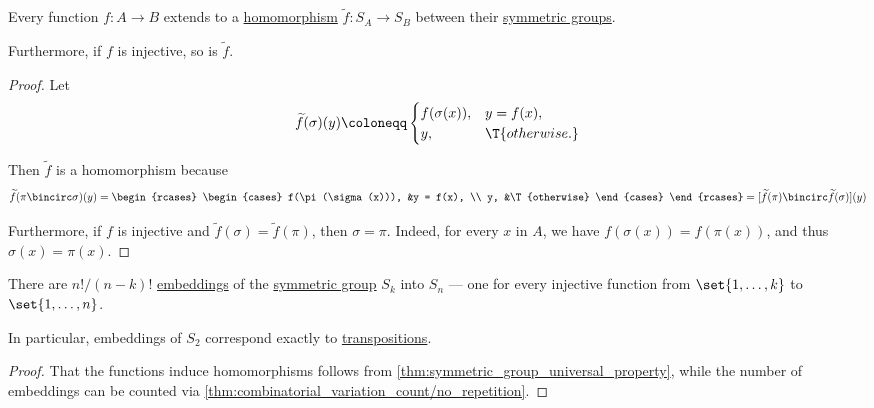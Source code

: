 \begin{proposition}\label{thm:symmetric_group_universal_property}
  Every function \( f: A \to B \) extends to a \hyperref[def:group/morphism]{homomorphism} \( \widetilde{f}: S_A \to S_B \) between their \hyperref[def:symmetric_group]{symmetric groups}.

  Furthermore, if \( f \) is injective, so is \( \widetilde{f} \).
\end{proposition}
\begin{proof}
  Let
  \begin{equation*}
    \widetilde{f}(\sigma)(y) \coloneqq \begin{cases}
      f(\sigma(x)), &y = f(x), \\
      y,            &\T{otherwise.}
    \end{cases}
  \end{equation*}

  Then \( \widetilde{f} \) is a homomorphism because
  \begin{equation*}
    \widetilde{f}(\pi \bincirc \sigma)(y)
    =
    \begin{rcases}
      \begin{cases}
        f(\pi(\sigma(x))), &y = f(x), \\
        y,                 &\T{otherwise}
      \end{cases}
    \end{rcases}
    =
    [\widetilde{f}(\pi) \bincirc \widetilde{f}(\sigma)](y)
  \end{equation*}

  Furthermore, if \( f \) is injective and \( \widetilde{f}(\sigma) = \widetilde{f}(\pi) \), then \( \sigma = \pi \). Indeed, for every \( x \) in \( A \), we have \( f(\sigma(x)) = f(\pi(x)) \), and thus \( \sigma(x) = \pi(x) \).
\end{proof}

\begin{corollary}\label{thm:sn_embeds_into_sm}
  There are \( n! / (n - k)! \) \hyperref[def:group/morphism]{embeddings} of the \hyperref[def:symmetric_group]{symmetric group} \( S_k \) into \( S_n \) --- one for every injective function from \( \set{ 1, \ldots, k } \) to \( \set{ 1, \ldots, n } \).
\end{corollary}
\begin{comments}
  \item In particular, embeddings of \( S_2 \) correspond exactly to \hyperref[def:transposition]{transpositions}.
\end{comments}
\begin{proof}
  That the functions induce homomorphisms follows from \cref{thm:symmetric_group_universal_property}, while the number of embeddings can be counted via \cref{thm:combinatorial_variation_count/no_repetition}.
\end{proof}

